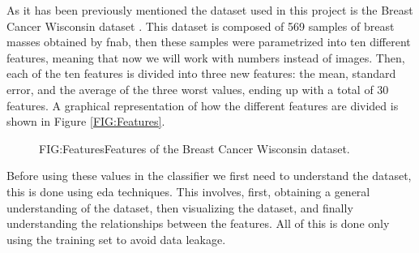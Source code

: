 As it has been previously mentioned the dataset used in this project is the Breast Cancer Wisconsin dataset \cite{william_wolberg_breast_1993}. This dataset is composed of 569 samples of breast masses obtained by \ac{fnab}, then these samples were parametrized into ten different features, meaning that now we will work with numbers instead of images. Then, each of the ten features is divided into three new features: the mean, standard error, and the average of the three worst values, ending up with a total of 30 features. A graphical representation of how the different features are divided is shown in Figure \ref{FIG:Features}.

\begin{figure}[Features]{FIG:Features}{Features of the Breast Cancer Wisconsin dataset.}
\end{figure}

Before using these values in the classifier we first need to understand the dataset, this is done using \ac{eda} techniques. This involves, first, obtaining a general understanding of the dataset, then visualizing the dataset, and finally understanding the relationships between the features. All of this is done only using the training set to avoid data leakage.

